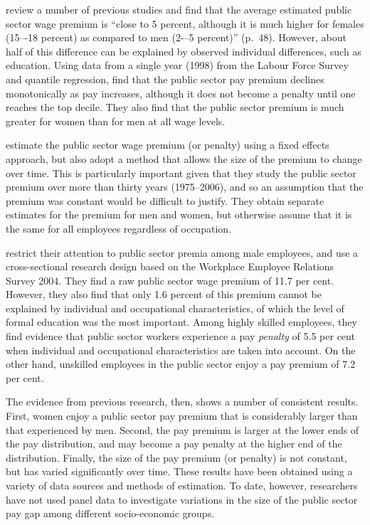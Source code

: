 \documentclass[a4paper,11pt,titlepage]{article}
\begin{document}
\citet{Luciflora2006} review a number of previous studies and find that the average estimated public sector wage premium is ``close to 5 percent, although  it  is  much  higher  for  females  (15–-18  percent)  as  compared  to
men (2-–5 percent)'' (p.~48).  However, about half of this difference can be explained by observed individual differences, such as education.   Using data from a single year (1998) from the Labour Force Survey and quantile regression, \citet{Luciflora2006} find that the public sector pay premium declines monotonically as pay increases, although it does not become a penalty until one reaches the top decile.  They also find that the public sector premium is much greater for women than for men at all wage levels.

\citet{Disney2008} estimate the public sector wage premium (or penalty) using a fixed effects approach, but also adopt a method that allows the size of the premium to change over time.  This is particularly important given that they study the public sector premium over more than thirty years (1975--2006), and so an assumption that the premium was constant would be difficult to justify.  They obtain separate estimates for the premium for men and women, but otherwise assume that it is the same for all employees regardless of occupation.

\citet{Chatterji2007} restrict their attention to public sector premia among male employees, and use a cross-sectional research design based on the Workplace Employee Relations Survey 2004.  They find a raw public sector wage premium of 11.7 per cent.  However, they also find that only 1.6 percent of this premium cannot be explained by individual and occupational characteristics, of which the level of formal education was the most important. Among highly skilled employees, they find evidence that public sector workers experience a pay \emph{penalty} of 5.5 per cent when individual and occupational characteristics are taken into account.  On the other hand, unskilled employees in the public sector enjoy a pay premium of 7.2 per cent.

The evidence from previous research, then, shows a number of consistent results. First, women enjoy a public sector pay premium that is considerably larger than that experienced by men.  Second, the pay premium is larger at the lower ends of the pay distribution, and may become a pay penalty at the higher end of the distribution.  Finally, the size of the pay premium (or penalty) is not constant, but has varied significantly over time.  These results have been obtained using a variety of data sources and methods of estimation.  To date, however, researchers have not used panel data to investigate variations in the size of the public sector pay gap among different socio-economic groups.
\end{document}

